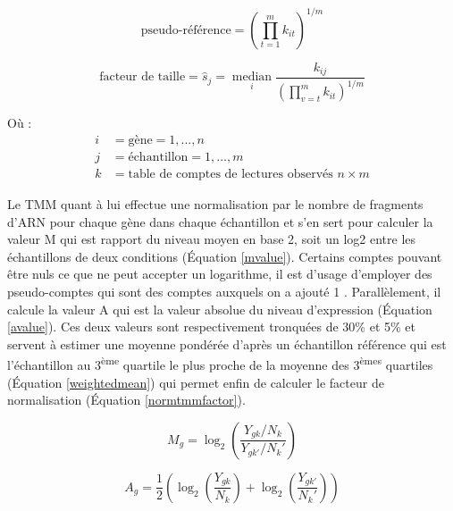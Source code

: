 \begin{equation}\label{pseudoref}
    \text{pseudo-référence} = \left(\prod_{t=1}^{m} k_{i t}\right)^{1 / m}
\end{equation}

\begin{equation}\label{sizefactor}
    \text{facteur de taille} = \hat{s}_{j}=\underset{i}{\operatorname{median}} \frac{k_{i j}}{\left(\prod_{v=t}^{m} k_{i t}\right)^{1 / m}}
\end{equation}


Où :
\begin{align*}
i & = \text{gène} = 1,..., n \\
j & = \text{échantillon} = 1,..., m \\
k & = \text{table de comptes de lectures observés } n \times m 
\end{align*}

Le TMM quant à lui effectue une normalisation par le nombre de fragments d'ARN pour chaque gène dans chaque échantillon et s'en sert pour calculer la valeur M qui est rapport du niveau moyen en base 2, soit un log2 entre les échantillons de deux conditions (Équation \ref{mvalue}). Certains comptes pouvant être nuls ce que ne peut accepter un logarithme, il est d'usage d'employer des pseudo-comptes qui sont des comptes auxquels on a ajouté 1 \cite{Booeshaghi2021Mar}. Parallèlement, il calcule la valeur A qui est la valeur absolue du niveau d'expression (Équation \ref{avalue}). Ces deux valeurs sont respectivement tronquées de 30\% et 5\% et servent à estimer une moyenne pondérée d'après un échantillon référence qui est l'échantillon au 3\textsuperscript{ème} quartile le plus proche de la moyenne des 3\textsuperscript{èmes} quartiles (Équation \ref{weightedmean}) qui permet enfin de calculer le facteur de normalisation (Équation \ref{normtmmfactor}).

\begin{equation}\label{mvalue}
    M_g = \log_{2} \left(\frac{Y_{gk} / N_k}{Y_{gk'} / N_k'}\right)
\end{equation}

\begin{equation}\label{avalue}
    A_g = \frac{1}{2} \left(\log_{2} \left(\frac{Y_{gk}}{N_k} \right) + \log_2 \left(\frac{Y_{gk'}}{N_k'}\right)\right)
\end{equation}


